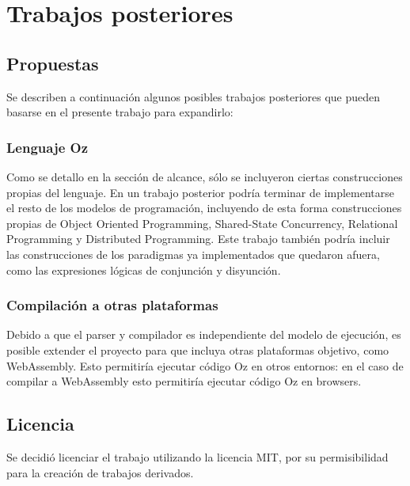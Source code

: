 \documentclass[a4paper,11pt]{article}
\begin{document}
\section{Trabajos posteriores}

\subsection{Propuestas}

Se describen a continuación algunos posibles trabajos posteriores que pueden basarse en el presente trabajo para expandirlo:

\subsubsection{Lenguaje Oz}

Como se detallo en la sección de alcance, sólo se incluyeron ciertas construcciones propias del lenguaje. En un trabajo posterior podría terminar de implementarse el resto de los modelos de programación, incluyendo de esta forma construcciones propias de Object Oriented Programming, Shared-State Concurrency, Relational Programming y Distributed Programming. Este trabajo también podría incluir las construcciones de los paradigmas ya implementados que quedaron afuera, como las expresiones lógicas de conjunción y disyunción.

\subsubsection{Compilación a otras plataformas}

Debido a que el parser y compilador es independiente del modelo de ejecución, es posible extender el proyecto para que incluya otras plataformas objetivo, como WebAssembly\cite{wasm}. Esto permitiría ejecutar código Oz en otros entornos: en el caso de compilar a WebAssembly esto permitiría ejecutar código Oz en browsers.


\subsection{Licencia}

Se decidió licenciar el trabajo utilizando la licencia MIT\cite{mit}, por su permisibilidad para la creación de trabajos derivados.
\end{document}
